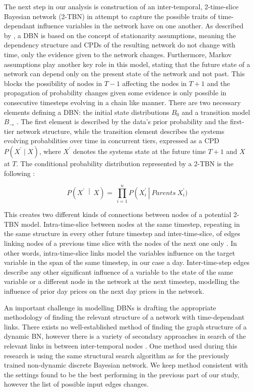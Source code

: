 \documentclass[12pt, letterpaper]{article}
\begin{document}
The next step in our analysis is construction of an inter-temporal, 2-time-slice Bayesian network (2-TBN) in attempt to capture the possible traits of time-dependant influence variables in the network have on one another. As described by \textcite{koller2009}, a DBN is based on the concept of stationarity assumptions, meaning the dependency structure and CPDs of the resulting network do not change with time, only the evidence given to the network changes. Furthermore, Markov assumptions play another key role in this model, stating that the future state of a network can depend only on the present state of the network and not past. This blocks the possibility of nodes in $T-1$ affecting the nodes in $T+1$ and the propagation of probability changes given some evidence is only possible in consecutive timesteps evolving in a chain like manner. There are two necessary elements defining a DBN: the initial state distributions $B_0$ and a transition model $B_\rightarrow$ \parencite{koller2009}. The first element is described by the data’s prior probability and the first-tier network structure, while the transition element describes the systems evolving probabilities over time in concurrent tiers, expressed as a CPD $P(X^\prime \mid X)$, where $X^\prime$ denotes the systems state at the future time $T+1$ and $X$ at $T$. The conditional probability distribution represented by a 2-TBN is the following \parencite{koller2009}:

\begin{equation}
P\left(X^\prime\ \middle|\ X\right)=\ \prod_{i=1}^{n}{P\left(X_i^\prime\ \right|\ Parents\ X_i^\prime)}
\end{equation}

This creates two different kinds of connections between nodes of a potential 2-TBN model. Intra-time-slice between nodes at the same timestep, repeating in the same structure in every other future timestep and inter-time-slice, of edges linking nodes of a previous time slice with the nodes of the next one only \parencite{koller2009}. In other words, intra-time-slice links model the variables influence on the target variable in the span of the same timestep, in our case a day. Inter-time-step edges describe any other significant influence of a variable to the state of the same variable or a different node in the network at the next timestep, modelling the influence of prior day prices on the next day prices in the network.

An important challenge in modelling DBNs is drafting the appropriate methodology of finding the relevant structure of a network with time-dependant links. There exists no well-established method of finding the graph structure of a dynamic BN, however there is a variety of secondary approaches in search of the relevant links in between inter-temporal nodes \parencite{murphy2002}. One method used during this research is using the same structural search algorithm as for the previously trained non-dynamic discrete Bayesian network. We keep method consistent with the settings found to be the best performing in the previous part of our study, however the list of possible input edges changes.
\end{document}
